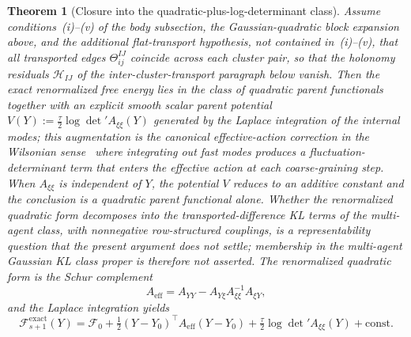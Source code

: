 \documentclass[11pt]{article}
\newtheorem{theorem}{Theorem}
\begin{document}
\begin{theorem}[Closure into the quadratic-plus-log-determinant class]
\label{thm:rg_exact_closure}
Assume conditions~(i)--(v) of the body subsection, the Gaussian-quadratic block expansion above, and the additional flat-transport hypothesis, not contained in~(i)--(v), that all transported edges $\Theta_{ij}^{IJ}$ coincide across each cluster pair, so that the holonomy residuals $\mathcal{H}_{IJ}$ of the inter-cluster-transport paragraph below vanish. Then the exact renormalized free energy lies in the class of quadratic parent functionals together with an explicit smooth scalar parent potential $V(Y) := \tfrac{\tau}{2}\log\det{}'A_{\xi\xi}(Y)$ generated by the Laplace integration of the internal modes; this augmentation is the canonical effective-action correction in the Wilsonian sense~\cite{Wilson1974, Cardy1996} where integrating out fast modes produces a fluctuation-determinant term that enters the effective action at each coarse-graining step. When $A_{\xi\xi}$ is independent of $Y$, the potential $V$ reduces to an additive constant and the conclusion is a quadratic parent functional alone. Whether the renormalized quadratic form decomposes into the transported-difference KL terms of the multi-agent class, with nonnegative row-structured couplings, is a representability question that the present argument does not settle; membership in the multi-agent Gaussian KL class proper is therefore not asserted. The renormalized quadratic form is the Schur complement
\begin{equation}
A_{\mathrm{eff}} = A_{YY} - A_{Y\xi}A_{\xi\xi}^{-1}A_{\xi Y},
\label{eq:rg_app_schur_complement}
\end{equation}
and the Laplace integration yields
\begin{equation}
\mathcal{F}_{s+1}^{\mathrm{exact}}(Y) = \mathcal{F}_0 + \tfrac{1}{2}(Y - Y_0)^\top A_{\mathrm{eff}}(Y - Y_0) + \tfrac{\tau}{2}\log\det{}'A_{\xi\xi}(Y) + \mathrm{const}.
\end{equation}
\end{theorem}
\end{document}
